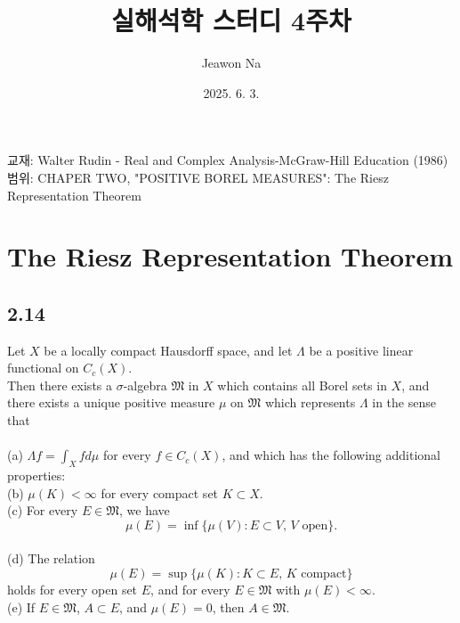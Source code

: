 \documentclass[11pt,reqno]{amsart}
\renewcommand{\(}{\left(}
\renewcommand{\)}{\right)}
\renewcommand{\[}{\left[}
\renewcommand{\]}{\right]}
\newenvironment{textbox}
  {\begin{tcolorbox}[
    colback=gray!10, 
    colframe=gray!50, 
    boxrule=0.5pt,
    fontupper=\normalfont
  ]}
  {\end{tcolorbox}}
\newcommand{\M}{\mathfrak{M}}
\begin{document}
\title[]{실해석학 스터디 4주차}
\author{Jeawon Na}
\date{2025. 6. 3.}

\maketitle

\vspace{0.5em}

교재: Walter Rudin - Real and Complex Analysis-McGraw-Hill Education (1986) \\
범위: CHAPER TWO, "POSITIVE BOREL MEASURES": The Riesz Representation Theorem

\section{The Riesz Representation Theorem}

\subsection{2.14}

\begin{textbox}
  Let $X$ be a locally compact Hausdorff space, and let $\Lambda$ be a positive linear functional on $C_c(X)$. \\
  Then there exists a $\sigma$-algebra $\M$ in $X$ which contains all Borel sets in $X$, 
  and there exists a unique positive measure $\mu$ on $\M$ which represents $\Lambda$ in the sense that \\ \\
  (a) $\Lambda f = \int_X f d \mu$ for every $f \in C_c(X)$, and which has the following additional properties: \\
  (b) $\mu(K) < \infty$ for every compact set $K \subset X$. \\
  (c) For every $E \in \M$, we have 
  \begin{equation*}
    \mu(E) = \inf \{ \mu(V) : E \subset V, \, V \text{ open} \}.
  \end{equation*} \\
  (d) The relation
  \begin{equation*}
    \mu(E) = \sup \{ \mu(K) : K \subset E, \, K \text{ compact} \}
  \end{equation*}
  holds for every open set $E$, and for every $E \in \M$ with $\mu(E) < \infty$. \\
  (e) If $E \in \M$, $A \subset E$, and $\mu(E) = 0$, then $A \in \M$.
\end{textbox}
\end{document}

